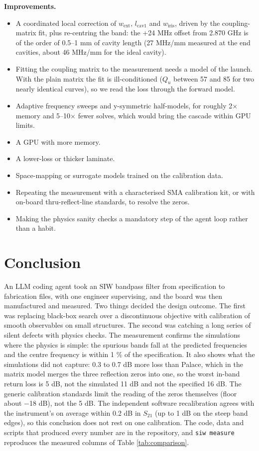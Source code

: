 \documentclass{ieeeaccess}
\begin{document}
\textbf{Improvements.}

\begin{itemize}
\item
  A coordinated local correction of \(w_{\text{ext}}\), \(l_{\text{cav1}}\) and \(w_{\text{iris}}\), driven by the
  coupling-matrix fit, plus re-centring the band: the +24 MHz offset from
  2.870 GHz is of the order of 0.5--1 mm of cavity length (27 MHz/mm measured at
  the end cavities, about 46 MHz/mm for the ideal cavity).
\item
  Fitting the coupling matrix to the measurement needs a model of the launch.
  With the plain matrix the fit is ill-conditioned (\(Q_u\) between 57 and 85 for
  two nearly identical curves), so we read the loss through the forward model.
\item
  Adaptive frequency sweeps and y-symmetric half-models, for roughly 2\ensuremath{\times} memory
  and 5--10\ensuremath{\times} fewer solves, which would bring the cascade within GPU limits.
\item
  A GPU with more memory.
\item
  A lower-loss or thicker laminate.
\item
  Space-mapping or surrogate models \cite{bandler2004space} trained on the
  calibration data.
\item
  Repeating the measurement with a characterised SMA calibration kit, or with
  on-board thru-reflect-line standards, to resolve the zeros.
\item
  Making the physics sanity checks a mandatory step of the agent loop rather
  than a habit.
\end{itemize}

\hypertarget{conclusion}{%
\section{Conclusion}\label{conclusion}}

An LLM coding agent took an SIW bandpass filter from specification to
fabrication files, with one engineer supervising, and the board was then
manufactured and measured. Two things decided the design outcome. The first was
replacing black-box search over a discontinuous objective with calibration of
smooth observables on small structures. The second was catching a long series
of silent defects with physics checks. The measurement confirms the
simulations where the physics is simple: the spurious bands fall at the
predicted frequencies and the centre frequency is within 1 \% of the specification. It also shows
what the simulations did not capture: 0.3 to 0.7 dB more loss than Palace,
which in the matrix model merges the three reflection zeros into one, so the
worst in-band return loss is 5 dB, not the simulated 11 dB and not the specified
16 dB. The generic calibration standards limit the reading of the zeros
themselves (floor about \ensuremath{-}18 dB), not the 5 dB. The
independent software recalibration agrees with the instrument's on average
within 0.2 dB in \(S_{21}\) (up to 1 dB on the steep band edges), so this conclusion does not rest on one calibration. The code,
data and scripts that produced every number are in the repository, and
\texttt{siw\ measure} reproduces the measured columns of Table \ref{tab:comparison}.
\end{document}
